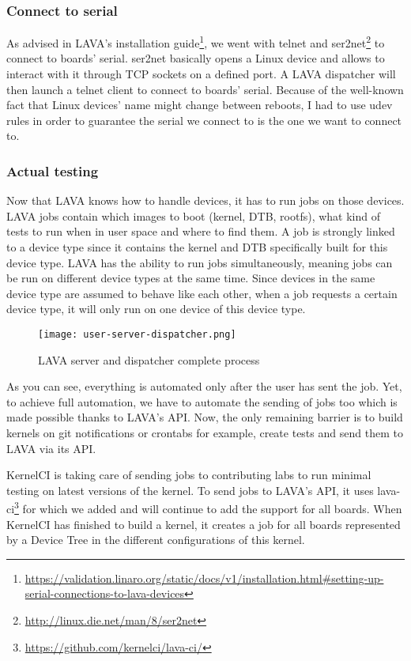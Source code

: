 \subsubsection{Connect to serial}

As advised in LAVA's installation guide\footnote{\url{https://validation.linaro.org/static/docs/v1/installation.html\#setting-up-serial-connections-to-lava-devices}}, we went with telnet and ser2net\footnote{\url{http://linux.die.net/man/8/ser2net}} to connect to boards' serial. ser2net basically opens a Linux device and allows to interact with it through TCP sockets on a defined port. A LAVA dispatcher will then launch a telnet client to connect to boards' serial. Because of the well-known fact that Linux devices' name might change between reboots, I had to use udev rules in order to guarantee the serial we connect to is the one we want to connect to.

\subsubsection{Actual testing}

Now that LAVA knows how to handle devices, it has to run jobs on those devices. LAVA jobs contain which images to boot (kernel, DTB, rootfs), what kind of tests to run when in user space and where to find them. A job is strongly linked to a device type since it contains the kernel and DTB specifically built for this device type. LAVA has the ability to run jobs simultaneously, meaning jobs can be run on different device types at the same time. Since devices in the same device type are assumed to behave like each other, when a job requests a certain device type, it will only run on one device of this device type.

\begin{figure}[H]
  \center
  \texttt{[image: user-server-dispatcher.png]}
  \caption{LAVA server and dispatcher complete process}
\end{figure}

As you can see, everything is automated only after the user has sent the job. Yet, to achieve full automation, we have to automate the sending of jobs too which is made possible thanks to LAVA's API. Now, the only remaining barrier is to build kernels on git notifications or crontabs for example, create tests and send them to LAVA via its API.

KernelCI is taking care of sending jobs to contributing labs to run minimal testing on latest versions of the kernel. To send jobs to LAVA's API, it uses lava-ci\footnote{\url{https://github.com/kernelci/lava-ci/}} for which we added and will continue to add the support for all boards. When KernelCI has finished to build a kernel, it creates a job for all boards represented by a Device Tree in the different configurations of this kernel.

